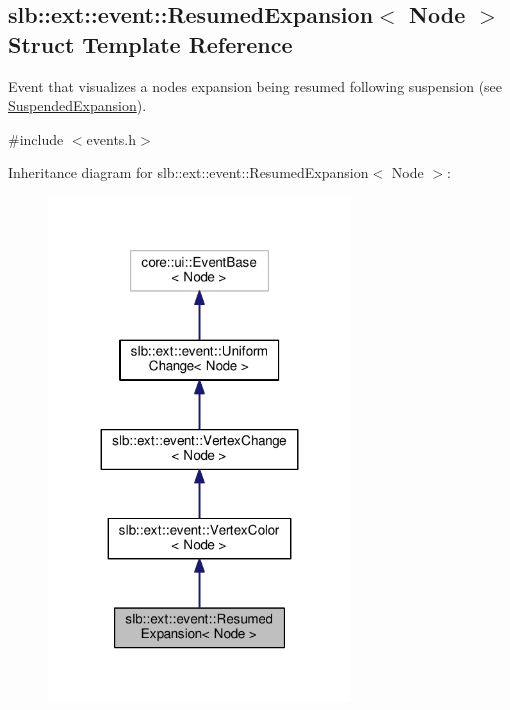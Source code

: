 \hypertarget{structslb_1_1ext_1_1event_1_1ResumedExpansion}{}\subsection{slb\+:\+:ext\+:\+:event\+:\+:Resumed\+Expansion$<$ Node $>$ Struct Template Reference}
\label{structslb_1_1ext_1_1event_1_1ResumedExpansion}


Event that visualizes a node\textquotesingle{}s expansion being resumed following suspension (see \hyperlink{structslb_1_1ext_1_1event_1_1SuspendedExpansion}{Suspended\+Expansion}).  




{\ttfamily \#include $<$events.\+h$>$}



Inheritance diagram for slb\+:\+:ext\+:\+:event\+:\+:Resumed\+Expansion$<$ Node $>$\+:\nopagebreak
\begin{figure}[H]
\begin{center}
\leavevmode
\includegraphics[width=227pt]{structslb_1_1ext_1_1event_1_1ResumedExpansion__inherit__graph}
\end{center}
\end{figure}


